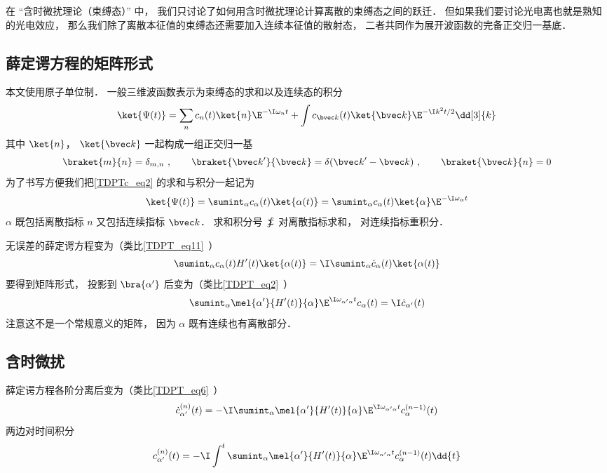 

在 “含时微扰理论（束缚态）” 中， 我们只讨论了如何用含时微扰理论计算离散的束缚态之间的跃迁． 但如果我们要讨论光电离也就是熟知的光电效应， 那么我们除了离散本征值的束缚态还需要加入连续本征值的散射态， 二者共同作为展开波函数的完备正交归一基底．

\subsection{薛定谔方程的矩阵形式}
本文使用原子单位制． 一般三维波函数表示为束缚态的求和以及连续态的积分
\begin{equation}\label{TDPTc_eq2}
\ket{\Psi(t)} = \sum_n c_n(t)\ket{n}\E^{-\I\omega_n t} + \int c_{\bvec k}(t)\ket{\bvec k}\E^{-\I k^2 t/2} \dd[3]{k}
\end{equation}
其中 $\ket{n}$， $\ket{\bvec k}$ 一起构成一组正交归一基
\begin{equation}
\braket{m}{n} = \delta_{m,n}~, \qquad
\braket{\bvec k'}{\bvec k} = \delta(\bvec k' - \bvec k)~, \qquad
\braket{\bvec k}{n} = 0
\end{equation}
为了书写方便我们把\autoref{TDPTc_eq2} 的求和与积分一起记为
\begin{equation}
\ket{\Psi(t)} = \sumint_\alpha c_\alpha(t) \ket{\alpha(t)} = \sumint_\alpha c_\alpha(t) \ket{\alpha}\E^{-\I\omega_\alpha t} 
\end{equation}
$\alpha$ 既包括离散指标 $n$ 又包括连续指标 $\bvec k$． 求和积分号 $\sumint$ 对离散指标求和， 对连续指标重积分．

无误差的薛定谔方程变为（类比\autoref{TDPT_eq11}~）
\begin{equation}
\sumint_\alpha c_\alpha(t) H'(t) \ket{\alpha(t)} = \I \sumint_\alpha \dot c_\alpha(t) \ket{\alpha(t)}
\end{equation}
要得到矩阵形式， 投影到 $\bra{\alpha'}$ 后变为（类比\autoref{TDPT_eq2}~）
\begin{equation}
\sumint_\alpha \mel{\alpha'}{H'(t)}{\alpha} \E^{\I \omega_{\alpha'\alpha} t} c_\alpha(t)
= \I \dot c_{\alpha'} (t)
\end{equation}
注意这不是一个常规意义的矩阵， 因为 $\alpha$ 既有连续也有离散部分．

\subsection{含时微扰}
薛定谔方程各阶分离后变为（类比\autoref{TDPT_eq6}~）
\begin{equation}
\dot c_{\alpha'}^{(n)}(t) = -\I \sumint_\alpha \mel{\alpha'}{H'(t)}{\alpha} \E^{\I \omega_{\alpha'\alpha} t} c_{\alpha}^{(n-1)}(t)
\end{equation}
两边对时间积分
\begin{equation}
c_{\alpha'}^{(n)}(t) = -\I \int^t \sumint_\alpha \mel{\alpha'}{H'(t)}{\alpha} \E^{\I \omega_{\alpha'\alpha} t} c_{\alpha}^{(n-1)}(t) \dd{t}
\end{equation}

